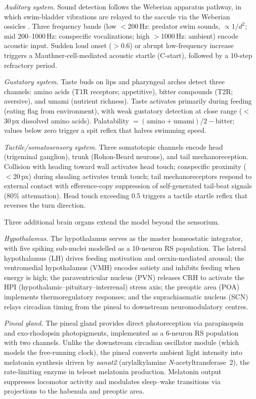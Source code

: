 \documentclass[12pt]{article}
\begin{document}
\emph{Auditory system.}
Sound detection follows the Weberian apparatus pathway, in which
swim-bladder vibrations are relayed to the saccule via the Weberian
ossicles \citep{popper2004}.
Three frequency bands (low $<$200\,Hz: predator swim sounds,
$\propto 1/d^2$; mid 200--1000\,Hz: conspecific vocalizations; high
$>$1000\,Hz: ambient) encode acoustic input.
Sudden loud onset ($>$0.6) or abrupt low-frequency increase triggers
a Mauthner-cell-mediated acoustic startle (C-start), followed by a
10-step refractory period.

\emph{Gustatory system.}
Taste buds on lips and pharyngeal arches detect three channels:
amino acids (T1R receptors; appetitive), bitter compounds (T2R;
aversive), and umami (nutrient richness).
Taste activates primarily during feeding (eating flag from
environment), with weak gustatory detection at close range
($<$30\,px dissolved amino acids).
Palatability $= (\text{amino} + \text{umami})/2 - \text{bitter}$;
values below zero trigger a spit reflex that halves swimming speed.

\emph{Tactile/somatosensory system.}
Three somatotopic channels encode head (trigeminal ganglion), trunk
(Rohon-Beard neurons), and tail mechanoreception.
Collision with heading toward wall activates head touch; conspecific
proximity ($<$20\,px) during shoaling activates trunk touch; tail
mechanoreceptors respond to external contact with efference-copy
suppression of self-generated tail-beat signals (80\% attenuation).
Head touch exceeding 0.5 triggers a tactile startle reflex that
reverses the turn direction.

Three additional brain organs extend the model beyond the sensorium.

\emph{Hypothalamus.}
The hypothalamus serves as the master homeostatic integrator, with five
spiking sub-nuclei modelled as a 10-neuron RS population.
The lateral hypothalamus (LH) drives feeding motivation and orexin-mediated
arousal; the ventromedial hypothalamus (VMH) encodes satiety and inhibits
feeding when energy is high; the paraventricular nucleus (PVN) releases CRH
to activate the HPI (hypothalamic--pituitary--interrenal) stress axis; the
preoptic area (POA) implements thermoregulatory responses; and the
suprachiasmatic nucleus (SCN) relays circadian timing from the pineal
to downstream neuromodulatory centres.

\emph{Pineal gland.}
The pineal gland provides direct photoreception via parapinopsin and
exo-rhodopsin photopigments, implemented as a 6-neuron RS population with
two channels.
Unlike the downstream circadian oscillator module (which models the
free-running clock), the pineal converts ambient light intensity into
melatonin synthesis driven by \emph{aanat2} (arylalkylamine
\textit{N}-acetyltransferase~2), the rate-limiting enzyme in teleost melatonin
production.
Melatonin output suppresses locomotor activity and modulates sleep--wake
transitions via projections to the habenula and preoptic area.
\end{document}
